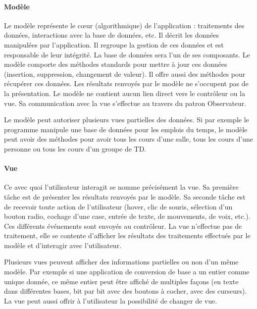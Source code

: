 \documentclass[a4paper,11pt,twoside]{report}
\begin{document}
  \paragraph*{Modèle}
  Le modèle représente le cœur (algorithmique) de l'application : traitements des données, interactions avec la base de données, etc. Il décrit les données manipulées par l'application. Il regroupe la gestion de ces données et est responsable de leur intégrité. La base de données sera l'un de ses composants. Le modèle comporte des méthodes standards pour mettre à jour ces données (insertion, suppression, changement de valeur). Il offre aussi des méthodes pour récupérer ces données. Les résultats renvoyés par le modèle ne s'occupent pas de la présentation. Le modèle ne contient aucun lien direct vers le contrôleur ou la vue. Sa communication avec la vue s'effectue au travers du patron Observateur.

  Le modèle peut autoriser plusieurs vues partielles des données. Si par exemple le programme manipule une base de données pour les emplois du temps, le modèle peut avoir des méthodes pour avoir tous les cours d'une salle, tous les cours d'une personne ou tous les cours d'un groupe de TD.

  \paragraph*{Vue}
  Ce avec quoi l'utilisateur interagit se nomme précisément la vue. Sa première tâche est de présenter les résultats renvoyés par le modèle. Sa seconde tâche est de recevoir toute action de l'utilisateur (hover, clic de souris, sélection d'un bouton radio, cochage d'une case, entrée de texte, de mouvements, de voix, etc.). Ces différents événements sont envoyés au contrôleur. La vue n'effectue pas de traitement, elle se contente d'afficher les résultats des traitements effectués par le modèle et d'interagir avec l'utilisateur.

  Plusieurs vues peuvent afficher des informations partielles ou non d'un même modèle. Par exemple si une application de conversion de base a un entier comme unique donnée, ce même entier peut être affiché de multiples façons (en texte dans différentes bases, bit par bit avec des boutons à cocher, avec des curseurs). La vue peut aussi offrir à l'utilisateur la possibilité de changer de vue.
\end{document}
